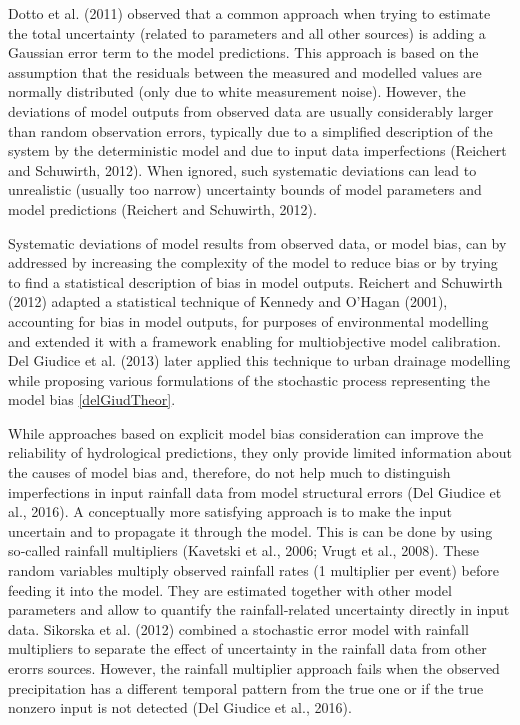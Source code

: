 \documentclass{ctuthesis}\usepackage[]{graphicx}\usepackage[]{color}
\begin{document}
Dotto et al. (2011) observed that a common approach when trying to estimate the total uncertainty
(related to parameters and all other sources) is adding a Gaussian error term to the model
predictions. This approach is based on the assumption that the residuals between the measured and
modelled values are normally distributed (only due to white measurement noise). However, the
deviations of model outputs from observed data are usually considerably larger than random
observation errors, typically due to a simplified description of the system by the deterministic model
and due to input data imperfections (Reichert and Schuwirth, 2012). When ignored, such systematic
deviations can lead to unrealistic (usually too narrow) uncertainty bounds of model parameters and
model predictions (Reichert and Schuwirth, 2012).

Systematic deviations of model results from observed data, or model bias, can by addressed by
increasing the complexity of the model to reduce bias or by trying to find a statistical description of
bias in model outputs. Reichert and Schuwirth (2012) adapted a statistical technique of Kennedy and
O’Hagan (2001), accounting for bias in model outputs, for purposes of environmental modelling and
extended it with a framework enabling for multiobjective model calibration. Del Giudice et al. (2013)
later applied this technique to urban drainage modelling while proposing various formulations of the
stochastic process representing the model bias {\ref{delGiudTheor}}.

While approaches based on explicit model bias consideration can improve the reliability of
hydrological predictions, they only provide limited information about the causes of model bias and,
therefore, do not help much to distinguish imperfections in input rainfall data from model structural
errors (Del Giudice et al., 2016). A conceptually more satisfying approach is to make the input
uncertain and to propagate it through the model. This is can be done by using so‐called rainfall
multipliers (Kavetski et al., 2006; Vrugt et al., 2008). These random variables multiply observed
rainfall rates (1 multiplier per event) before feeding it into the model. They are estimated together
with other model parameters and allow to quantify the rainfall‐related uncertainty directly in input
data. Sikorska et al. (2012) combined a stochastic error model with rainfall multipliers to separate the effect of uncertainty in the rainfall data from other erorrs sources. However, the rainfall multiplier approach fails when the observed precipitation has a different temporal pattern from the true one or if the true nonzero input is not detected (Del Giudice et al., 2016). 
\end{document}
